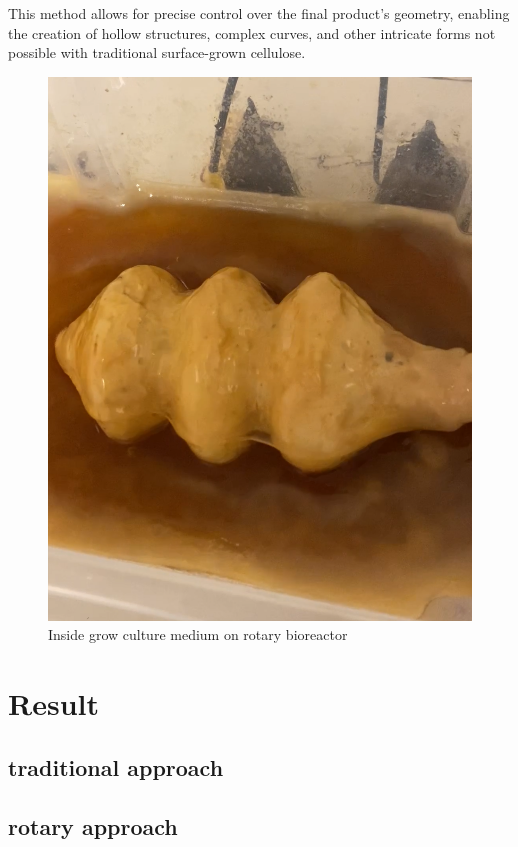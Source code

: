 This method allows for precise control over the final product's geometry, enabling the creation of hollow structures, complex curves, and other intricate forms not possible with traditional surface-grown cellulose. 
\begin{figure}[h]
    \centering
    \includegraphics{images/insiderotary.png}
    \caption{Inside grow culture medium on rotary bioreactor}
    \label{fig:rotary inside}
\end{figure} 

\section{Result}

\subsection{traditional approach}

\subsection{rotary approach}